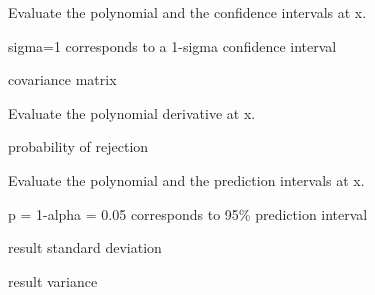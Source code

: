 \documentclass[letterpaper,10pt,english]{sphinxmanual}
\begin{document}
\begin{fulllineitems}
\begin{fulllineitems}
\label{api/wsolve:refl1d.wsolve.PolynomialModel.ci}
Evaluate the polynomial and the confidence intervals at x.

sigma=1 corresponds to a 1-sigma confidence interval

\end{fulllineitems}


\begin{fulllineitems}
\label{api/wsolve:refl1d.wsolve.PolynomialModel.cov}
covariance matrix

\end{fulllineitems}


\begin{fulllineitems}
\label{api/wsolve:refl1d.wsolve.PolynomialModel.der}
Evaluate the polynomial derivative at x.

\end{fulllineitems}


\begin{fulllineitems}
\label{api/wsolve:refl1d.wsolve.PolynomialModel.p}
probability of rejection

\end{fulllineitems}


\begin{fulllineitems}
\label{api/wsolve:refl1d.wsolve.PolynomialModel.pi}
Evaluate the polynomial and the prediction intervals at x.

p = 1-alpha = 0.05 corresponds to 95\% prediction interval

\end{fulllineitems}


\begin{fulllineitems}
\label{api/wsolve:refl1d.wsolve.PolynomialModel.std}
result standard deviation

\end{fulllineitems}


\begin{fulllineitems}
\label{api/wsolve:refl1d.wsolve.PolynomialModel.var}
result variance

\end{fulllineitems}


\end{fulllineitems}
\end{document}
